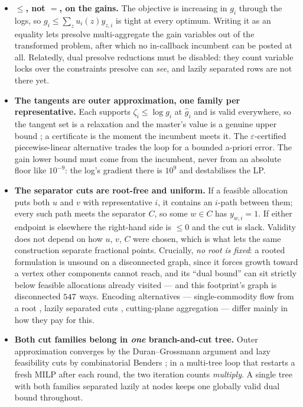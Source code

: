 \documentclass[11pt]{article}
\theoremstyle{definition}
\begin{document}
\begin{itemize}
\item \textbf{$\le$, not $=$, on the gains.} The objective is increasing in $g_i$ through
the logs, so $g_i\le\sum_z u_i(z)y_{z,i}$ is tight at every optimum. Writing it as an
equality lets presolve multi-aggregate the gain variables out of the transformed problem,
after which no in-callback incumbent can be posted at all. Relatedly, dual presolve
reductions must be disabled: they count variable locks over the constraints presolve can
\emph{see}, and lazily separated rows are not there yet.
\item \textbf{The tangents are outer approximation, one family per representative.} Each
supports $\zeta_i\le\log g_i$ at $\hat g_i$ and is valid everywhere, so the tangent set is a
relaxation and the master's value is a genuine upper bound \citep{duran1986,fletcher1994};
a certificate is the moment the incumbent meets it. The $\varepsilon$-certified
piecewise-linear alternative \citep{vielma2011,caragiannis2019} trades the loop for a
bounded a-priori error. The gain lower bound must come from the incumbent, never from an
absolute floor like $10^{-9}$: the log's gradient there is $10^{9}$ and destabilises the LP.
\item \textbf{The separator cuts are root-free and uniform.} If a feasible allocation puts
both $u$ and $v$ with representative $i$, it contains an $i$-path between them; every such
path meets the separator $C$, so some $w\in C$ has $y_{w,i}=1$. If either endpoint is
elsewhere the right-hand side is $\le0$ and the cut is slack. Validity does not depend on
how $u$, $v$, $C$ were chosen, which is what lets the same construction separate fractional
points. Crucially, \emph{no root is fixed}: a rooted formulation is unsound on a
disconnected graph, since it forces growth toward a vertex other components cannot reach,
and its ``dual bound'' can sit strictly below feasible allocations already visited --- and
this footprint's graph is disconnected $547$ ways. Encoding alternatives ---
single-commodity flow from a root \citep{shirabe2005}, lazily separated cuts
\citep{validi2021,validibuchanan2022}, cutting-plane aggregation \citep{oehrlein2017} ---
differ mainly in how they pay for this.
\item \textbf{Both cut families belong in \emph{one} branch-and-cut tree.} Outer
approximation converges by the Duran--Grossmann argument and lazy feasibility cuts by
combinatorial Benders \citep{hooker2003,codato2006}; in a multi-tree loop that restarts a
fresh MILP after each round, the two iteration counts \emph{multiply}. A single tree with
both families separated lazily at nodes \citep{quesada1992,bonami2008,validi2021} keeps one
globally valid dual bound throughout.
\end{itemize}
\end{document}
